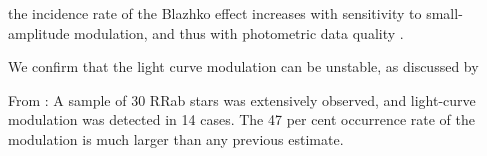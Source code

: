 the incidence rate of the Blazhko effect increases with sensitivity to small-amplitude modulation, and thus with
photometric data quality \citep{2009MNRAS.400.1006J}.

 
We confirm that the light curve modulation can be unstable, as discussed by \cite{2009MNRAS.400.1006J} 



From \cite{2009MNRAS.400.1006J}: A sample of 30 RRab stars was extensively observed, and light-curve modulation was detected in 14 cases. The 47 per cent occurrence rate of the modulation is much larger than any previous estimate. 